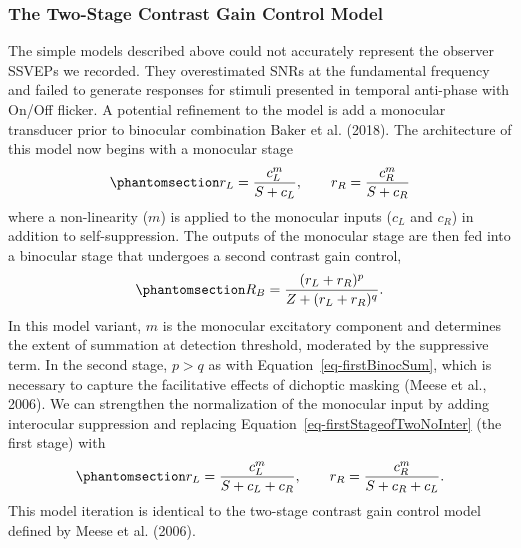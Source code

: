\documentclass[
  12pt,
]{article}
\begin{document}
\subsubsection{The Two-Stage Contrast Gain Control
Model}\label{the-two-stage-contrast-gain-control-model}

The simple models described above could not accurately represent the
observer SSVEPs we recorded. They overestimated SNRs at the fundamental
frequency and failed to generate responses for stimuli presented in
temporal anti-phase with On/Off flicker. A potential refinement to the
model is add a monocular transducer prior to binocular combination Baker
et al. (2018). The architecture of this model now begins with a
monocular stage
\begin{equation}\phantomsection\label{eq-firstStageofTwoNoInter}{
r_L = \frac{c_L^m}{S + c_L}, \qquad r_R = \frac{c_R^m}{S + c_R}
}\end{equation} where a non-linearity (\(m\)) is applied to the
monocular inputs (\(c_L\) and \(c_R\)) in addition to self-suppression.
The outputs of the monocular stage are then fed into a binocular stage
that undergoes a second contrast gain control,
\begin{equation}\phantomsection\label{eq-binocComb}{
R_{B} = \frac{(r_L+r_R)^p}{Z+(r_L+r_R)^q}.
}\end{equation} In this model variant, \(m\) is the monocular excitatory
component and determines the extent of summation at detection threshold,
moderated by the suppressive term. In the second stage, \(p > q\) as
with Equation~\ref{eq-firstBinocSum}, which is necessary to capture the
facilitative effects of dichoptic masking (Meese et al., 2006). We can
strengthen the normalization of the monocular input by adding
interocular suppression and replacing
Equation~\ref{eq-firstStageofTwoNoInter} (the first stage) with
\begin{equation}\phantomsection\label{eq-firstStageofTwo}{
r_{L} = \frac{c_L^m}{S + c_L + c_R}, \qquad r_R = \frac{c_R^m}{S + c_R + c_L}.
}\end{equation} This model iteration is identical to the two-stage
contrast gain control model defined by Meese et al. (2006).
\end{document}
